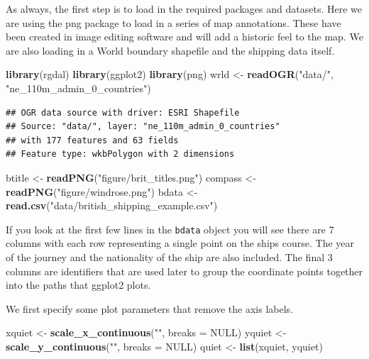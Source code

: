 \documentclass[]{article}
\newenvironment{Shaded}{}{}
\newcommand{\KeywordTok}[1]{\textcolor[rgb]{0.00,0.44,0.13}{\textbf{{#1}}}}
\newcommand{\DataTypeTok}[1]{\textcolor[rgb]{0.56,0.13,0.00}{{#1}}}
\newcommand{\StringTok}[1]{\textcolor[rgb]{0.25,0.44,0.63}{{#1}}}
\newcommand{\OtherTok}[1]{\textcolor[rgb]{0.00,0.44,0.13}{{#1}}}
\newcommand{\NormalTok}[1]{{#1}}
\begin{document}
As always, the first step is to load in the required packages and
datasets. Here we are using the png package to load in a series of map
annotations. These have been created in image editing software and will
add a historic feel to the map. We are also loading in a World boundary
shapefile and the shipping data itself.

\begin{Shaded}
\begin{Highlighting}[]
\KeywordTok{library}\NormalTok{(rgdal)}
\KeywordTok{library}\NormalTok{(ggplot2)}
\KeywordTok{library}\NormalTok{(png)}
\NormalTok{wrld <- }\KeywordTok{readOGR}\NormalTok{(}\StringTok{"data/"}\NormalTok{, }\StringTok{"ne_110m_admin_0_countries"}\NormalTok{)}
\end{Highlighting}
\end{Shaded}

\begin{verbatim}
## OGR data source with driver: ESRI Shapefile 
## Source: "data/", layer: "ne_110m_admin_0_countries"
## with 177 features and 63 fields
## Feature type: wkbPolygon with 2 dimensions
\end{verbatim}

\begin{Shaded}
\begin{Highlighting}[]
\NormalTok{btitle <- }\KeywordTok{readPNG}\NormalTok{(}\StringTok{"figure/brit_titles.png"}\NormalTok{)}
\NormalTok{compass <- }\KeywordTok{readPNG}\NormalTok{(}\StringTok{"figure/windrose.png"}\NormalTok{)}
\NormalTok{bdata <- }\KeywordTok{read.csv}\NormalTok{(}\StringTok{"data/british_shipping_example.csv"}\NormalTok{)}
\end{Highlighting}
\end{Shaded}

If you look at the first few lines in the \texttt{bdata} object you will
see there are 7 columns with each row representing a single point on the
ships course. The year of the journey and the nationality of the ship
are also included. The final 3 columns are identifiers that are used
later to group the coordinate points together into the paths that
ggplot2 plots.

We first specify some plot parameters that remove the axis labels.

\begin{Shaded}
\begin{Highlighting}[]
\NormalTok{xquiet <- }\KeywordTok{scale_x_continuous}\NormalTok{(}\StringTok{""}\NormalTok{, }\DataTypeTok{breaks =} \OtherTok{NULL}\NormalTok{)}
\NormalTok{yquiet <- }\KeywordTok{scale_y_continuous}\NormalTok{(}\StringTok{""}\NormalTok{, }\DataTypeTok{breaks =} \OtherTok{NULL}\NormalTok{)}
\NormalTok{quiet <- }\KeywordTok{list}\NormalTok{(xquiet, yquiet)}
\end{Highlighting}
\end{Shaded}
\end{document}
